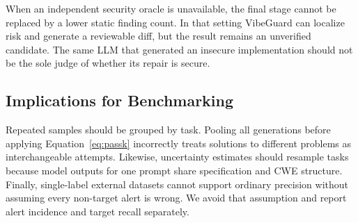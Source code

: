 \documentclass[sigconf,nonacm]{acmart}
\begin{document}
When an independent security oracle is unavailable, the final stage cannot be
replaced by a lower static finding count. In that setting VibeGuard can localize
risk and generate a reviewable diff, but the result remains an unverified
candidate. The same LLM that generated an insecure implementation should not be
the sole judge of whether its repair is secure.

\subsection{Implications for Benchmarking}

Repeated samples should be grouped by task. Pooling all generations before
applying Equation~\ref{eq:passk} incorrectly treats solutions to different
problems as interchangeable attempts. Likewise, uncertainty estimates should
resample tasks because model outputs for one prompt share specification and CWE
structure. Finally, single-label external datasets cannot support ordinary
precision without assuming every non-target alert is wrong. We avoid that
assumption and report alert incidence and target recall separately.
\end{document}
